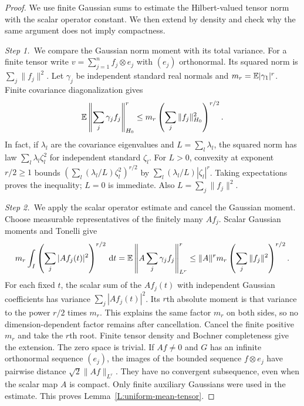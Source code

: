 \begin{proof}
  We use finite Gaussian sums to estimate the Hilbert-valued tensor norm with
  the scalar operator constant. We then extend by density and check why the
  same argument does not imply compactness.


  \medskip
  \noindent\textit{Step 1.~}We compare the Gaussian norm moment with its total
  variance.
  For a finite tensor write $v = \sum_{j=1}^n f_j\otimes e_j$ with $(e_j)$
  orthonormal. Its squared norm is $\sum_j\|f_j\|^2$. Let $\gamma_j$ be
  independent standard real normals and $m_r = \mathbb{E}|\gamma_1|^r$. Finite
  covariance diagonalization gives
  \[
    \mathbb{E}\left\|\sum_j\gamma_j f_j\right\|_{H_0}^r
    \le m_r\left(\sum_j\|f_j\|_{H_0}^2\right)^{r/2}.
  \]
  In fact, if $\lambda_l$ are the covariance eigenvalues and $L =
  \sum_l\lambda_l$, the squared norm has law $\sum_l\lambda_l\zeta_l^2$ for
  independent standard $\zeta_l$. For $L > 0$, convexity at exponent $r/2 \ge 1$
  bounds $(\sum_l(\lambda_l/L)\zeta_l^2)^{r/2}$ by
  $\sum_l(\lambda_l/L)|\zeta_l|^r$. Taking expectations proves the inequality;
  $L = 0$ is immediate. Also $L = \sum_j\|f_j\|^2$.


  \medskip
  \noindent\textit{Step 2.~}We apply the scalar operator estimate and cancel
  the Gaussian moment.
  Choose measurable representatives of the finitely many $Af_j$. Scalar Gaussian
  moments and Tonelli give
  \[
    m_r\int_I\left(\sum_j|Af_j(t)|^2\right)^{r/2}\,\mathrm{d} t
    =\mathbb{E}\left\|A\sum_j\gamma_jf_j\right\|_{L^r}^r
    \le\|A\|^rm_r\left(\sum_j\|f_j\|^2\right)^{r/2}.
  \]
  For each fixed $t$, the scalar sum of the $Af_j(t)$ with independent
  Gaussian coefficients has variance $\sum_j|Af_j(t)|^2$. Its $r$th absolute
  moment is that variance to the power $r/2$ times $m_r$. This explains the
  same factor $m_r$ on both sides, so no dimension-dependent factor remains
  after cancellation.
  Cancel the finite positive $m_r$ and take the $r$th root. Finite tensor
  density and Bochner completeness give the extension. The zero space is
  trivial. If $Af \ne 0$ and $G$ has an infinite orthonormal sequence $(e_j)$,
  the images of the bounded sequence $f\otimes e_j$ have pairwise distance
  $\sqrt2\|Af\|_{L^r}$. They have no convergent subsequence, even when the
  scalar map $A$ is compact. Only finite auxiliary Gaussians were used in the
  estimate. This proves Lemma~\ref{L:uniform-mean-tensor}.
\end{proof}

